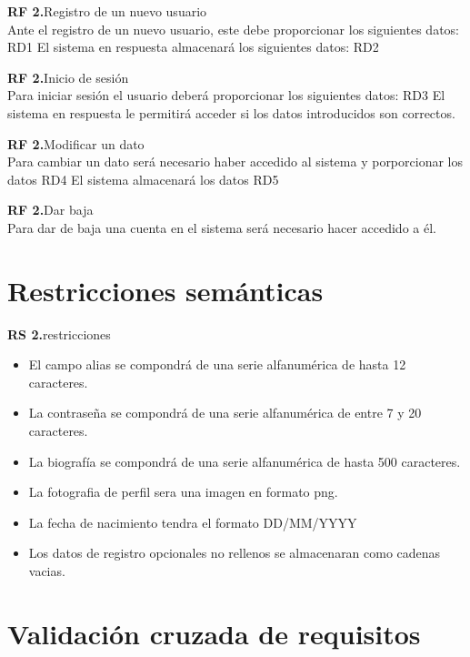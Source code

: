 \documentclass[11pt,a4paper]{article}
\newcounter{RFdCounter} %
\newcommand{\rfd}[1]{\addtocounter{RFdCounter}{1}\textbf{\rmfamily RF 2.\theRFdCounter}\quad#1\\}
\newcounter{RSdCounter} %
\newcommand{\rsd}[1]{\addtocounter{RSdCounter}{1}\textbf{\rmfamily RS 2.\theRSdCounter}\quad#1\\}
\begin{document}
\rfd{Registro de un nuevo usuario}
Ante el registro de un nuevo usuario, este debe proporcionar los siguientes datos:
RD1
El sistema en respuesta almacenará los siguientes datos:
RD2
\rfd{Inicio de sesión}
Para iniciar sesión el usuario deberá proporcionar los siguientes datos:
RD3
El sistema en respuesta le permitirá acceder si los datos introducidos son correctos.
\rfd{Modificar un dato}
Para cambiar un dato será necesario haber accedido al sistema y porporcionar los datos
RD4
El sistema almacenará los datos
RD5
\rfd{Dar baja}
Para dar de baja una cuenta en el sistema será necesario hacer accedido a él.


\section{Restricciones semánticas}

\rsd{restricciones}
\begin{itemize}
\item El campo alias se compondrá de una serie alfanumérica de hasta 12 caracteres.
\item La contraseña se compondrá de una serie alfanumérica de entre 7 y 20 caracteres.
\item La biografía se compondrá de una serie alfanumérica de hasta 500 caracteres.
\item La fotografia de perfil sera una imagen en formato png.
\item La fecha de nacimiento tendra el formato DD/MM/YYYY
\item Los datos de registro opcionales no rellenos se almacenaran como cadenas vacias.
\end{itemize}

\section{Validación cruzada de requisitos}
\end{document}
